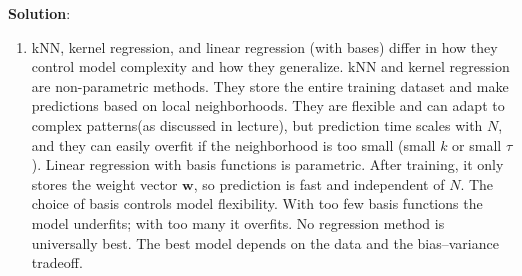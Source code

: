\documentclass[submit]{harvardml}
\newenvironment{solution}{
    \vspace{2mm}
    \color{blue}\noindent\textbf{Solution}:
}{}
\begin{document}
\begin{solution}
\begin{enumerate}
\item kNN, kernel regression, and linear regression (with bases) differ in how they control model
complexity and how they generalize. kNN and kernel regression are non-parametric methods. They store the entire training
dataset and make predictions based on local neighborhoods. They are flexible and can adapt to complex patterns(as discussed in lecture), but prediction time scales with $N$, and they can easily overfit if the neighborhood is too small (small $k$ or small $\tau$). Linear regression with basis functions is parametric. After training, it only stores
the weight vector $\mathbf w$, so prediction is fast and independent of $N$. The choice of basis controls model flexibility. With too few basis functions the model
underfits; with too many it overfits. No regression method is universally best. The best model depends on the data and the
bias–variance tradeoff. 
	\end{enumerate}
\end{solution}

\newpage
\end{document}
